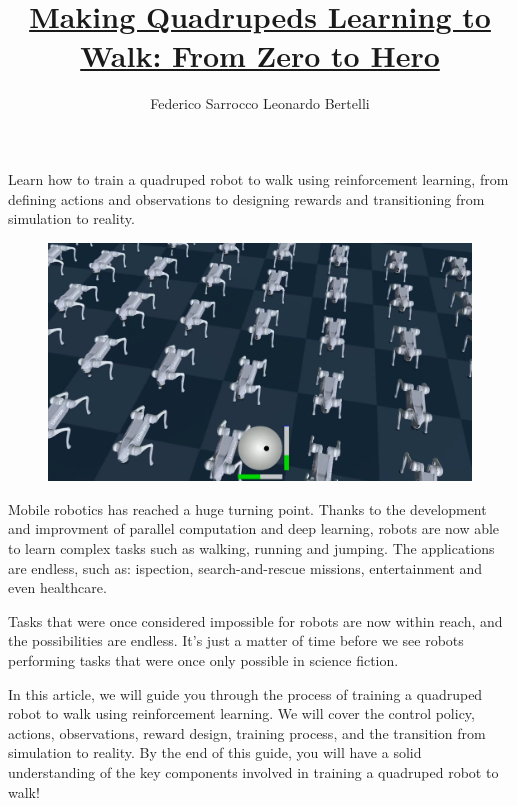 \documentclass[en,hazy5,blue,11pt,normal]{elegantnote}
\title{\href{https://github.com/Argo-Robot/quadrupeds_locomotion}{Making Quadrupeds Learning to Walk: From Zero to Hero}}
\author{Federico Sarrocco \qquad Leonardo Bertelli}
\begin{document}
\maketitle

\begin{highlightbox}
	Learn how to train a quadruped robot to walk using reinforcement learning, from defining actions and observations to designing rewards and transitioning from simulation to reality.
\end{highlightbox}

\begin{figure}[!h]
	\centering
	\includegraphics[width=1\linewidth]{fig/screenshot001}
	\label{fig:screenshot001}
\end{figure}

Mobile robotics has reached a huge turning point. Thanks to the development and improvment of parallel computation and deep learning, robots are now able to learn complex tasks such as walking, running and jumping. The applications are endless, such as: ispection, search-and-rescue missions, entertainment and even healthcare.

\begin{highlightbox}
	Tasks that were once considered impossible for robots are now within reach, and the possibilities are endless. It's just a matter of time before we see robots performing tasks that were once only possible in science fiction.
\end{highlightbox}

In this article, we will guide you through the process of training a quadruped robot to walk using reinforcement learning. We will cover the control policy, actions, observations, reward design, training process, and the transition from simulation to reality. By the end of this guide, you will have a solid understanding of the key components involved in training a quadruped robot to walk!
\end{document}
